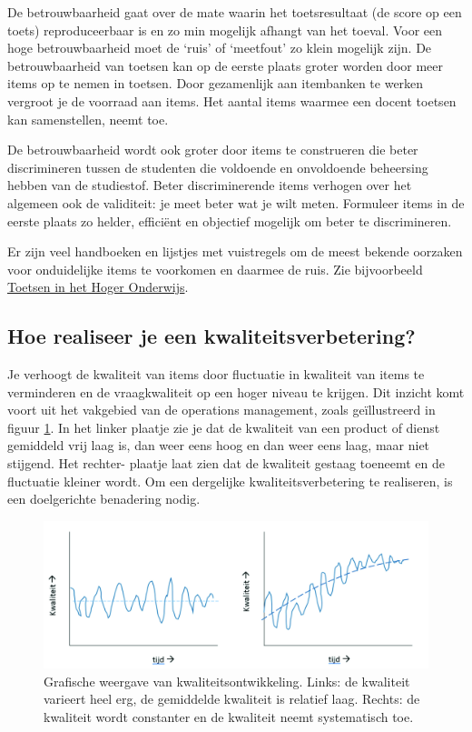 \documentclass[
]{book}
\begin{document}
De betrouwbaarheid gaat over de mate waarin het toetsresultaat (de score op een toets) reproduceerbaar is en zo min mogelijk afhangt van het toeval. Voor een hoge betrouwbaarheid moet de `ruis' of `meetfout' zo klein mogelijk zijn. De betrouwbaarheid van toetsen kan op de eerste plaats groter worden door meer items op te nemen in toetsen. Door gezamenlijk aan itembanken te werken vergroot je de voorraad aan items. Het aantal items waarmee een docent toetsen kan samenstellen, neemt toe.

De betrouwbaarheid wordt ook groter door items te construeren die beter discrimineren tussen de studenten die voldoende en onvoldoende beheersing hebben van de studiestof. Beter discriminerende items verhogen over het algemeen ook de validiteit: je meet beter wat je wilt meten. Formuleer items in de eerste plaats zo helder, efficiënt en objectief mogelijk om beter te discrimineren.

Er zijn veel handboeken en lijstjes met vuistregels om de meest bekende oorzaken voor onduidelijke items te voorkomen en daarmee de ruis. Zie bijvoorbeeld \citet{van2017toetsen} \href{https://www.google.com/search?q=toetsen+in+het+hoger+onderwijs}{Toetsen in het Hoger Onderwijs}.

\hypertarget{hoe-realiseer-je-een-kwaliteitsverbetering}{%
\subsection{Hoe realiseer je een kwaliteitsverbetering?}\label{hoe-realiseer-je-een-kwaliteitsverbetering}}

Je verhoogt de kwaliteit van items door fluctuatie in kwaliteit van items te verminderen en de vraagkwaliteit op een hoger niveau te krijgen. Dit inzicht komt voort uit het vakgebied van de operations management, zoals geïllustreerd in figuur \ref{fig:KwaliTijd}. In het linker plaatje zie je dat de kwaliteit van een product of dienst gemiddeld vrij laag is, dan weer eens hoog en dan weer eens laag, maar niet stijgend. Het rechter- plaatje laat zien dat de kwaliteit gestaag toeneemt en de fluctuatie kleiner wordt. Om een dergelijke kwaliteitsverbetering te realiseren, is een doelgerichte benadering nodig.

\begin{figure}[left]
\includegraphics[width=1\linewidth]{images/fig11} \caption{Grafische weergave van kwaliteitsontwikkeling. Links: de kwaliteit varieert heel erg, de gemiddelde kwaliteit is relatief laag. Rechts: de kwaliteit wordt constanter en de kwaliteit neemt systematisch toe.}\label{fig:KwaliTijd}
\end{figure}
\end{document}
